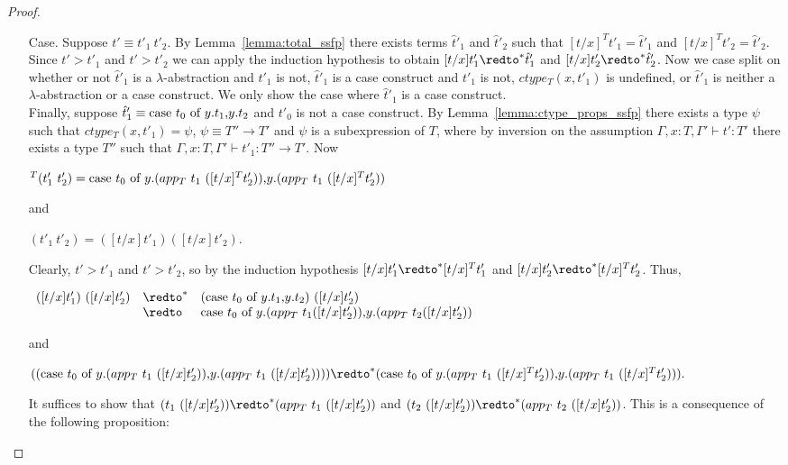 \begin{proof}
\begin{itemize}
  \item[Case.] Suppose $t' \equiv t'_1\ t'_2$.  By Lemma~\ref{lemma:total_ssfp}
    there exists terms $\hat{t}'_1$ and $\hat{t}'_2$
    such that $[t/x]^T t'_1 = \hat{t}'_1$ and $[t/x]^T t'_2 = \hat{t}'_2$.  Since
    $t' > t'_1$ and $t' > t'_2$ we can apply the induction hypothesis to obtain
    $[t/x]t'_1 \redto^* \hat{t}'_1$ and $[t/x]t'_2 \redto^* \hat{t}'_2$.  Now we case
    split on whether or not $\hat{t}'_1$ is a $\lambda$-abstraction and $t'_1$ is not, $\hat{t}'_1$ is a case construct and
    $t'_1$ is not, $ctype_T(x,t'_1)$ is undefined, or $\hat{t}'_1$ is neither a $\lambda$-abstraction or a case construct.  
    We only show the case where $\hat{t}'_1$ is a case construct.
    \ \\
    Finally, suppose $\hat{t}'_1 \equiv \mbox{case}\ t_0\ \text{of}\ y\text{.}t_1\text{,}y\text{.}t_2$ and $t'_0$ is not a case construct.  By Lemma~\ref{lemma:ctype_props_ssfp}
    there exists a type $\psi$ such that $ctype_T(x,t'_1) = \psi$, $\psi \equiv T'' \to T'$ and $\psi$ is a subexpression
    of $T$, where by inversion on the assumption $\Gamma,x:T,\Gamma' \vdash t':T'$ there exists a type $T''$ such that
    $\Gamma,x:T,\Gamma' \vdash t'_1:T'' \to T'$.  Now 
    \begin{center}
      \begin{math}
        [t/x]^T (t'_1\ t'_2) = \ccon{t_0}{y}{(app_T\ t_1\ ([t/x]^T t'_2))}{(app_T\ t_1\ ([t/x]^T t'_2))}
      \end{math}
    \end{center}
    and
    \begin{center}
      \begin{math}
        [t/x](t'_1\ t'_2) = ([t/x]t'_1)([t/x]t'_2).
      \end{math}
    \end{center}
    Clearly, $t' > t'_1$ and $t' > t'_2$, so by the induction hypothesis $[t/x]t'_1 \redto^* [t/x]^T t'_1$ and $[t/x]t'_2 \redto^* [t/x]^T t'_2$.  Thus,
    \begin{center}
      \begin{math}
        \begin{array}{lll}
          ([t/x]t'_1)\ ([t/x]t'_2) & \redto^* & (\ccon{t_0}{y}{t_1}{t_2})\ ([t/x]t'_2)\\
          & \redto & \ccon{t_0}{y}{(app_T\ t_1 ([t/x]t'_2))}{(app_T\ t_2 ([t/x]t'_2))}
        \end{array}
      \end{math}
    \end{center}
    and
    \begin{center}
      \begin{math}
        ((\ccon{t_0}{y}{(app_T\ t_1\ ([t/x] t'_2))}{(app_T\ t_1\ ([t/x] t'_2))})) \redto^* (\ccon{t_0}{y}{(app_T\ t_1\ ([t/x]^T t'_2))}{(app_T\ t_1\ ([t/x]^T t'_2))}).
      \end{math}
    \end{center}
    It suffices to show that $(t_1\ ([t/x] t'_2)) \redto^* (app_T\ t_1\ ([t/x] t'_2))$ and 
    $(t_2\ ([t/x] t'_2)) \redto^* (app_T\ t_2\ ([t/x] t'_2))$.  This is a consequence of the following proposition:
    

\end{itemize}
\end{proof}
